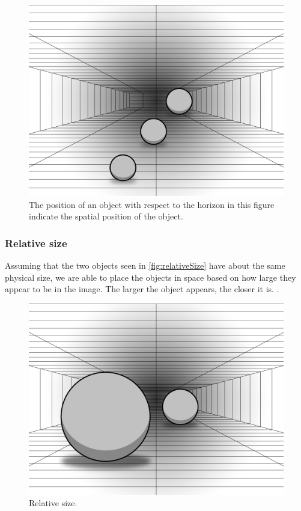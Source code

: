 \begin{figure}[H]
	\centering
	\includegraphics[width=1\linewidth]{figure/Analysis/relativeHeight.png}
	\caption{The position of an object with respect to the horizon in this figure indicate the spatial position of the object.}
	\label{fig:relativeHeight}
\end{figure}

\subsubsection{Relative size}
Assuming that the two objects seen in \autoref{fig:relativeSize} have about the same physical size, we are able to place the objects in space based on how large they appear to be in the image. The larger the object appears, the closer it is. \citep{sensationPerception}.
\begin{figure}[H]
	\centering
	\includegraphics[width=1\linewidth]{figure/Analysis/relativeSize.png}
	\caption{Relative size.}
	\label{fig:relativeSize}
\end{figure}

